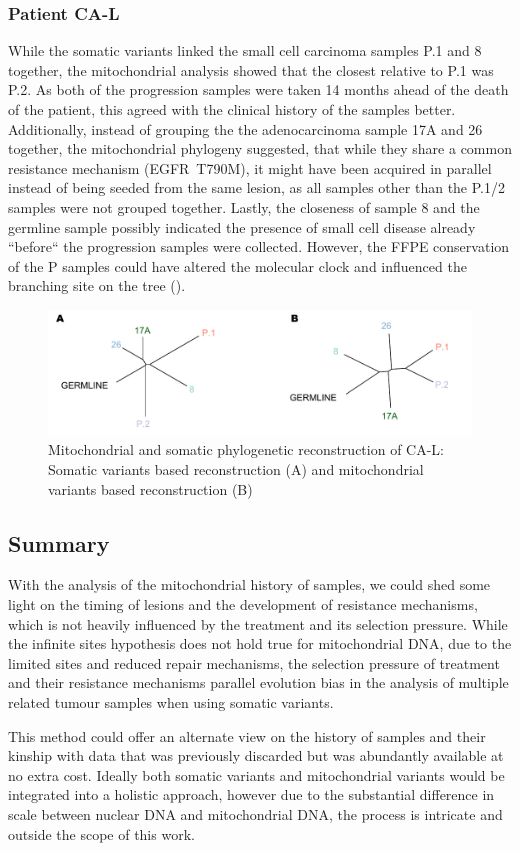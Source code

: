 \subsubsection{Patient CA-L}
While the somatic variants linked the small cell carcinoma samples P.1 and 8 together, the mitochondrial analysis showed that the closest relative to P.1 was P.2. As both of the progression samples were taken 14 months ahead of the death of the patient, this agreed with the clinical history of the samples better. Additionally, instead of grouping the the adenocarcinoma sample 17A and 26 together, the mitochondrial phylogeny suggested, that while they share a common resistance mechanism (EGFR~T790M), it might have been acquired in parallel instead of being seeded from the same lesion, as all samples other than the P.1/2 samples were not grouped together. Lastly, the closeness of sample 8 and the germline sample possibly indicated the presence of small cell disease already ``before`` the progression samples were collected. However, the FFPE conservation of the P samples could have altered the molecular clock and influenced the branching site on the tree ().

\begin{figure}[ht]
\centering
\includegraphics[width=.99\linewidth]{Figures/CASCADE/mito/CA86SomVsMitoPhylo.pdf}
\caption[Mitochondrial and somatic phylogenetic reconstruction of CA-L]{Mitochondrial and somatic phylogenetic reconstruction of CA-L: Somatic variants based reconstruction (A) and mitochondrial variants based reconstruction (B)} \label{fig:CA86mitoPhylo}
\end{figure}

\subsection{Summary}
With the analysis of the mitochondrial history of samples, we could shed some light on the timing of lesions and the development of resistance mechanisms, which is not heavily influenced by the treatment and its selection pressure. While the infinite sites hypothesis does not hold true for mitochondrial DNA, due to the limited sites and reduced repair mechanisms, the selection pressure of treatment and their resistance mechanisms parallel evolution bias in the analysis of multiple related tumour samples when using somatic variants.

This method could offer an alternate view on the history of samples and their kinship with data that was previously discarded but was abundantly available at no extra cost. Ideally both somatic variants and mitochondrial variants would be integrated into a holistic approach, however due to the substantial difference in scale between nuclear DNA and mitochondrial DNA, the process is intricate and outside the scope of this work.